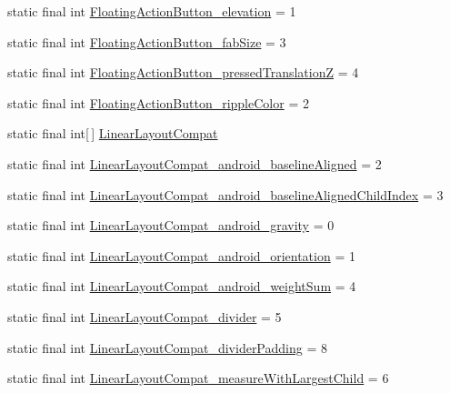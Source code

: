 \begin{DoxyCompactItemize}
\item 
static final int \hyperlink{classcheck_1_1test_1_1_r_1_1styleable_af996a59bf7a9501bc11bbb4a5451900e}{Floating\+Action\+Button\+\_\+elevation} = 1
\item 
static final int \hyperlink{classcheck_1_1test_1_1_r_1_1styleable_a9f7ddd112d179b839c66772f44baf8fc}{Floating\+Action\+Button\+\_\+fab\+Size} = 3
\item 
static final int \hyperlink{classcheck_1_1test_1_1_r_1_1styleable_ae7c3b194d0b7e221bd1700bb86de5567}{Floating\+Action\+Button\+\_\+pressed\+Translation\+Z} = 4
\item 
static final int \hyperlink{classcheck_1_1test_1_1_r_1_1styleable_a59b8eecd772872da56ad0f0984dee569}{Floating\+Action\+Button\+\_\+ripple\+Color} = 2
\item 
static final int\mbox{[}$\,$\mbox{]} \hyperlink{classcheck_1_1test_1_1_r_1_1styleable_a1cee5a37a541e5cb360983f35ebfe0fc}{Linear\+Layout\+Compat}
\item 
static final int \hyperlink{classcheck_1_1test_1_1_r_1_1styleable_a67d8b5abe1097b46cea7bee93c465465}{Linear\+Layout\+Compat\+\_\+android\+\_\+baseline\+Aligned} = 2
\item 
static final int \hyperlink{classcheck_1_1test_1_1_r_1_1styleable_a856d64f5e68d12a9b3a5daaacfa57e7b}{Linear\+Layout\+Compat\+\_\+android\+\_\+baseline\+Aligned\+Child\+Index} = 3
\item 
static final int \hyperlink{classcheck_1_1test_1_1_r_1_1styleable_abe8ac977e2400616ce150828d8ec6a26}{Linear\+Layout\+Compat\+\_\+android\+\_\+gravity} = 0
\item 
static final int \hyperlink{classcheck_1_1test_1_1_r_1_1styleable_a7888ca0cf0cdae867cd8a4826d080062}{Linear\+Layout\+Compat\+\_\+android\+\_\+orientation} = 1
\item 
static final int \hyperlink{classcheck_1_1test_1_1_r_1_1styleable_ae245bae0548f5ad66ca9cf0a1cdb45b4}{Linear\+Layout\+Compat\+\_\+android\+\_\+weight\+Sum} = 4
\item 
static final int \hyperlink{classcheck_1_1test_1_1_r_1_1styleable_ac11ca4a97787af8e1f1d162edcc0c436}{Linear\+Layout\+Compat\+\_\+divider} = 5
\item 
static final int \hyperlink{classcheck_1_1test_1_1_r_1_1styleable_afdc801825abf8606d597921106733dda}{Linear\+Layout\+Compat\+\_\+divider\+Padding} = 8
\item 
static final int \hyperlink{classcheck_1_1test_1_1_r_1_1styleable_a68068887a622f9abc4411ad0205c6676}{Linear\+Layout\+Compat\+\_\+measure\+With\+Largest\+Child} = 6

\end{DoxyCompactItemize}
